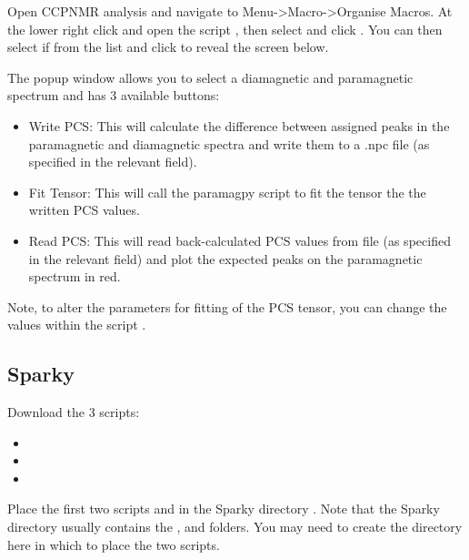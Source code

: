 \documentclass[a4paper,10pt,english,openany,oneside]{sphinxmanual}
\begin{document}
Open CCPNMR analysis and navigate to Menu-\textgreater{}Macro-\textgreater{}Organise Macros. At the lower right click  and open the script , then select  and click . You can then select if from the list and click  to reveal the screen below.

\noindent{}

The popup window allows you to select a diamagnetic and paramagnetic spectrum and has 3 available buttons:
\begin{itemize}
\item {} 
Write PCS: This will calculate the difference between assigned peaks in the paramagnetic and diamagnetic spectra and write them to a .npc file (as specified in the relevant field).

\item {} 
Fit Tensor: This will call the paramagpy script  to fit the tensor the the written PCS values.

\item {} 
Read PCS: This will read back-calculated PCS values from file (as specified in the relevant field) and plot the expected peaks on the paramagnetic spectrum in red.

\end{itemize}

Note, to alter the parameters for fitting of the PCS tensor, you can change the values within the script .


\subsection{Sparky}
\label{\detokenize{nmr_software_macros/index:sparky}}
Download the 3 scripts:
\begin{itemize}
\item {} 

\item {} 

\item {} 

\end{itemize}

Place the first two scripts  and  in the Sparky directory . Note that the Sparky directory usually contains the ,  and  folders. You may need to create the  directory here in which to place the two scripts.
\end{document}
